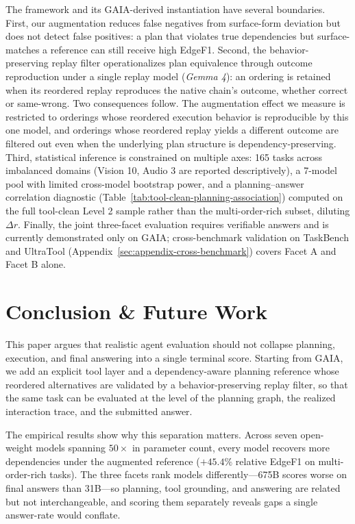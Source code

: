 \documentclass{article}
\providecommand{\model}[1]{\emph{#1}}
\begin{document}
The framework and its GAIA-derived instantiation have several boundaries. First, our augmentation reduces false negatives from surface-form deviation but does not detect false positives: a plan that violates true dependencies but surface-matches a reference can still receive high EdgeF1. 
Second, the behavior-preserving replay filter operationalizes plan equivalence through outcome reproduction under a single replay model (\model{Gemma 4}): an ordering is retained when its reordered replay reproduces the native chain's outcome, whether correct or same-wrong. 
Two consequences follow. The augmentation effect we measure is restricted to orderings whose reordered execution behavior is reproducible by this one model, and orderings whose reordered replay yields a different outcome are filtered out even when the underlying plan structure is dependency-preserving.
Third, statistical inference is constrained on multiple axes: 165 tasks across imbalanced domains (Vision 10, Audio 3 are reported descriptively), a 7-model pool with limited cross-model bootstrap power, and a planning--answer correlation diagnostic (Table~\ref{tab:tool-clean-planning-association}) computed on the full tool-clean Level 2 sample rather than the multi-order-rich subset, diluting $\Delta r$.
Finally, the joint three-facet evaluation requires verifiable answers and is currently demonstrated only on GAIA; cross-benchmark validation on TaskBench and UltraTool (Appendix~\ref{sec:appendix-cross-benchmark}) covers Facet A and Facet B alone.

\section{Conclusion \& Future Work}

This paper argues that realistic agent evaluation should not collapse planning, execution, and final answering into a single terminal score. Starting from GAIA, we add an explicit tool layer and a dependency-aware planning reference whose reordered alternatives are validated by a behavior-preserving replay filter, so that the same task can be evaluated at the level of the planning graph, the realized interaction trace, and the submitted answer.

The empirical results show why this separation matters. Across seven open-weight models spanning $50\times$ in parameter count, every model recovers more dependencies under the augmented reference ($+45.4\%$ relative EdgeF1 on multi-order-rich tasks). The three facets rank models differently---675B scores worse on final answers than 31B---so planning, tool grounding, and answering are related but not interchangeable, and scoring them separately reveals gaps a single answer-rate would conflate.
\end{document}
